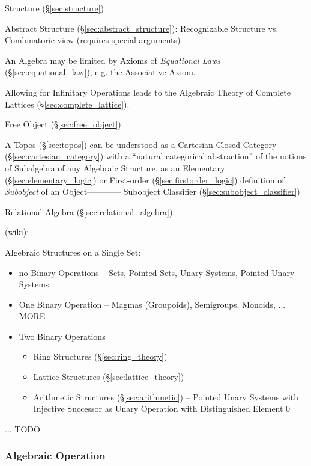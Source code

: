 Structure (\S\ref{sec:structure})

Abstract Structure (\S\ref{sec:abstract_structure}): Recognizable Structure vs.
Combinatoric view (requires special arguments)

An Algebra may be limited by Axioms of \emph{Equational Laws}
(\S\ref{sec:equational_law}), e.g. the Associative Axiom.

Allowing for Infinitary Operations leads to the Algebraic Theory of Complete
Lattices (\S\ref{sec:complete_lattice}).

Free Object (\S\ref{sec:free_object})

\fist A Topos (\S\ref{sec:topos}) can be understood as a Cartesian Closed
Category (\S\ref{sec:cartesian_category}) with a ``natural categorical
abstraction'' of the notions of Subalgebra of any Algebraic Structure, as an
Elementary (\S\ref{sec:elementary_logic}) or First-order
(\S\ref{sec:firstorder_logic}) definition of \emph{Subobject} of an
Object------------ Subobject Classifier (\S\ref{sec:subobject_classifier})

\fist Relational Algebra (\S\ref{sec:relational_algebra})

(wiki):

Algebraic Structures on a Single Set:

\begin{itemize}
  \item no Binary Operations -- Sets, Pointed Sets, Unary Systems, Pointed
    Unary Systems
  \item One Binary Operation -- Magmas (Groupoids), Semigroups, Monoids, ...
    MORE
  \item Two Binary Operations
    \begin{itemize}
      \item Ring Structures (\S\ref{sec:ring_theory})
      \item Lattice Structures (\S\ref{sec:lattice_theory})
      \item Arithmetic Structures (\S\ref{sec:arithmetic}) -- Pointed Unary
        Systems with Injective Successor as Unary Operation with Distinguished
        Element $0$
    \end{itemize}
\end{itemize}

... TODO



\subsubsection{Algebraic Operation}\label{sec:algebraic_operation}


